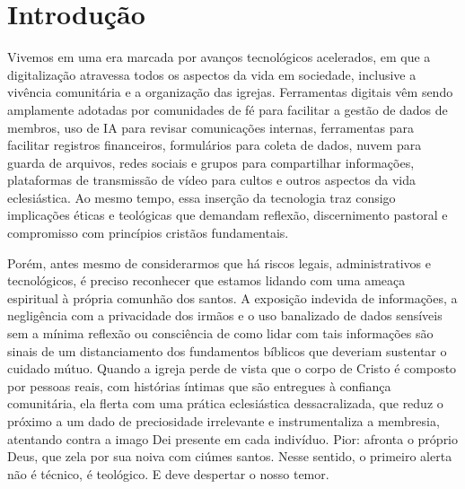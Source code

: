 \newcommand{\tituloIntroducao}{Introdução}

\chapter*{\tituloIntroducao}
\addcontentsline{toc}{section}{\MakeUppercase{\tituloIntroducao}}

Vivemos em uma era marcada por avanços tecnológicos acelerados, em que a digitalização atravessa todos os aspectos da vida em sociedade, inclusive a vivência comunitária e a organização das igrejas. Ferramentas digitais vêm sendo amplamente adotadas por comunidades de fé para facilitar a gestão de dados de membros, uso de IA para revisar comunicações internas, ferramentas para facilitar registros financeiros, formulários para coleta de dados, nuvem para guarda de arquivos, redes sociais e grupos para compartilhar informações, plataformas de transmissão de vídeo para cultos e outros aspectos da vida eclesiástica. Ao mesmo tempo, essa inserção da tecnologia traz consigo implicações éticas e teológicas que demandam reflexão, discernimento pastoral e compromisso com princípios cristãos fundamentais.

Porém, antes mesmo de considerarmos que há riscos legais, administrativos e tecnológicos, é preciso reconhecer que estamos lidando com uma ameaça espiritual à própria comunhão dos santos. A exposição indevida de informações, a negligência com a privacidade dos irmãos e o uso banalizado de dados sensíveis sem a mínima reflexão ou consciência de como lidar com tais informações são sinais de um distanciamento dos fundamentos bíblicos que deveriam sustentar o cuidado mútuo. Quando a igreja perde de vista que o corpo de Cristo é composto por pessoas reais, com histórias íntimas que são entregues à confiança comunitária, ela flerta com uma prática eclesiástica dessacralizada, que reduz o próximo a um dado de preciosidade irrelevante e instrumentaliza a membresia, atentando contra a imago Dei presente em cada indivíduo. Pior: afronta o próprio Deus, que zela por sua noiva com ciúmes santos. Nesse sentido, o primeiro alerta não é técnico, é teológico. E deve despertar o nosso temor.


